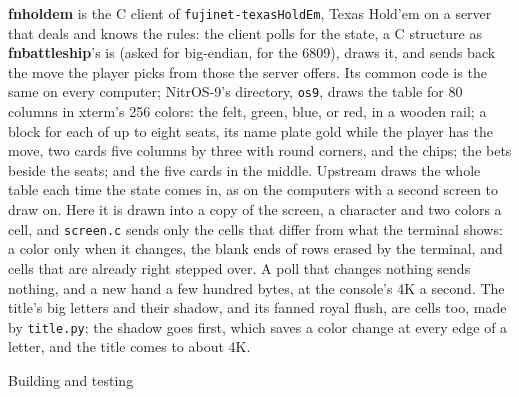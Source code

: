 \documentclass[10pt,twoside,openany]{book}
\makeatletter
\newcommand{\cmd}[1]{\textbf{#1}}            %
\newcommand{\file}[1]{\texttt{#1}}           %
\renewcommand{\subsection}{\@startsection{subsection}{2}{0pt}{2.4ex plus 0.6ex}{0.8ex}%
  {\sffamily\bfseries\normalsize}}
\makeatother
\begin{document}
\cmd{fnholdem} is the C client of \texttt{fujinet-texasHoldEm}, Texas
Hold'em on a server that deals and knows the rules: the client polls for
the state, a C structure as \cmd{fnbattleship}'s is (asked for
big-endian, for the 6809), draws it, and sends back the move the player
picks from those the server offers. Its common code is the same on every
computer; NitrOS-9's directory, \file{os9}, draws the table for 80
columns in xterm's 256 colors: the felt, green, blue, or red, in a
wooden rail; a block for each of up to eight seats, its name plate gold
while the player has the move, two cards five columns by three with
round corners, and the chips; the bets beside the seats; and the five
cards in the middle. Upstream draws the whole table each time the state
comes in, as on the computers with a second screen to draw on. Here it
is drawn into a copy of the screen, a character and two colors a cell,
and \file{screen.c} sends only the cells that differ from what the
terminal shows: a color only when it changes, the blank ends of rows
erased by the terminal, and cells that are already right stepped over.
A poll that changes nothing sends nothing, and a new hand a few hundred
bytes, at the console's 4K a second. The title's big letters and their
shadow, and its fanned royal flush, are cells too, made by
\file{title.py}; the shadow goes first, which saves a color change at
every edge of a letter, and the title comes to about 4K.

\subsection{Building and testing}
\end{document}
